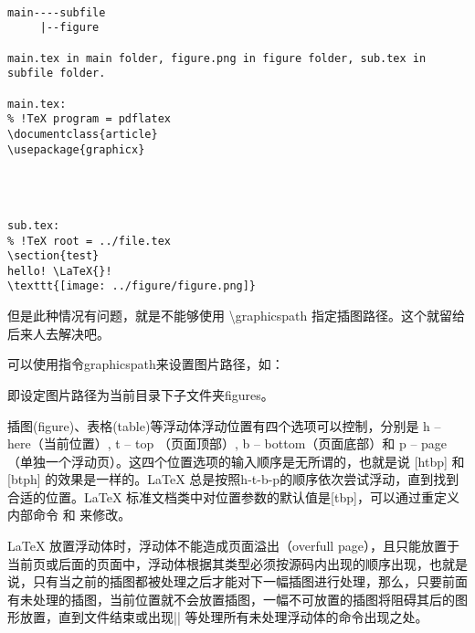 \begin{verbatim}

main----subfile
     |--figure

main.tex in main folder, figure.png in figure folder, sub.tex in subfile folder.

main.tex:
% !TeX program = pdflatex
\documentclass{article}
\usepackage{graphicx}

  


sub.tex:
% !TeX root = ../file.tex
\section{test}
hello! \LaTeX{}!
\texttt{[image: ../figure/figure.png]}

\end{verbatim}

但是此种情况有问题，就是不能够使用 \textbackslash{}graphicspath
指定插图路径。这个就留给后来人去解决吧。


可以使用指令graphicspath来设置图片路径，如：
\begin{texinlist}
\graphicspath{{./figures/}}
\end{texinlist}

即设定图片路径为当前目录下子文件夹figures。



插图(figure)、表格(table)等浮动体浮动位置有四个选项可以控制，分别是 h --
here（当前位置）, t -- top （页面顶部）, b -- bottom（页面底部）和 p --
page（单独一个浮动页）。这四个位置选项的输入顺序是无所谓的，也就是说
{[}htbp{]} 和 {[}btph{]} 的效果是一样的。LaTeX
总是按照h-t-b-p的顺序依次尝试浮动，直到找到合适的位置。LaTeX
标准文档类中对位置参数的默认值是{[}tbp{]}，可以通过重定义内部命令
 和 来修改。

\begin{texinlist}
\makeatletter
\def\fps@figure{htbp}
\def\fps@table{htbp}
\makeatother
\end{texinlist}

LaTeX 放置浮动体时，浮动体不能造成页面溢出（overfull
page），且只能放置于当前页或后面的页面中，浮动体根据其类型必须按源码内出现的顺序出现，也就是说，只有当之前的插图都被处理之后才能对下一幅插图进行处理，那么，只要前面有未处理的插图，当前位置就不会放置插图，一幅不可放置的插图将阻碍其后的图形放置，直到文件结束或出现|\clearpage| 等处理所有未处理浮动体的命令出现之处。

